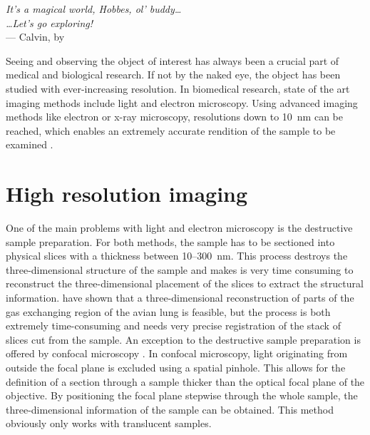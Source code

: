 \acresetall
{}\label{ch:Introduction}
\begin{flushright}{\slshape    
		It's a magical world, Hobbes, ol' buddy\ldots\\
		\ldots Let's go exploring!}\\ \medskip
		--- Calvin, by \citep{Watterson1996}
\end{flushright}
\vspace{52mm}

Seeing and observing the object of interest has always been a crucial part of medical and biological research. If not by the naked eye, the object has been studied with ever-increasing resolution. In biomedical research, state of the art imaging methods include light and electron microscopy. Using advanced imaging methods like electron or x-ray microscopy, resolutions down to \SI{10}{\nano\meter}  can be reached, which enables an extremely accurate rendition of the sample to be examined .

\section{High resolution imaging}
One of the main problems with light and electron microscopy is the destructive sample preparation. For both methods, the sample has to be sectioned into physical slices with a thickness between 10--\SI{300}{\nano\meter}. This process destroys the three-dimensional structure of the sample and makes is very time consuming to reconstruct the three-dimensional placement of the slices to extract the structural information. \citet{Woodward2005} have shown that a three-dimensional reconstruction of parts of the gas exchanging region of the avian lung is feasible, but the process is both extremely time-consuming and needs very precise registration of the stack of slices cut from the sample. An exception to the destructive sample preparation is offered by confocal microscopy \cite{Minsky1961}. In confocal microscopy, light originating from outside the focal plane is excluded using a spatial pinhole. This allows for the definition of a section through a sample thicker than the optical focal plane of the objective. By positioning the focal plane stepwise through the whole sample, the three-dimensional information of the sample can be obtained. This method obviously only works with translucent samples.


